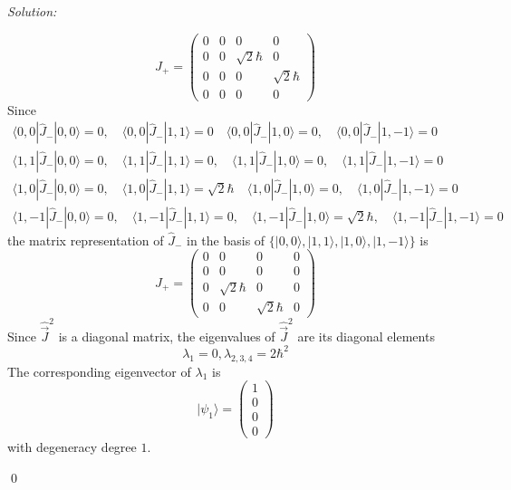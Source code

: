 \documentclass[10pt,a4paper]{article}
\newenvironment{sol}
    {\emph{Solution:}
    }
    {
    \qed
    }
\begin{document}
\begin{sol}
\begin{itemize}
\begin{equation}
\hat{J}_+=\left(\begin{array}{cccc}
0&0&0&0\\
0&0&\sqrt{2}\hbar&0\\
0&0&0&\sqrt{2}\hbar\\
0&0&0&0
\end{array}\right)
\end{equation}
Since
\begin{gather}
\langle0,0|\hat{J}_-|0,0\rangle=0,\quad\langle0,0|\hat{J}_-|1,1\rangle=0\quad\langle0,0|\hat{J}_-|1,0\rangle=0,\quad\langle0,0|\hat{J}_-|1,-1\rangle=0\\
\langle1,1|\hat{J}_-|0,0\rangle=0,\quad\langle1,1|\hat{J}_-|1,1\rangle=0,\quad\langle1,1|\hat{J}_-|1,0\rangle=0,\quad\langle1,1|\hat{J}_-|1,-1\rangle=0\\
\langle1,0|\hat{J}_-|0,0\rangle=0,\quad\langle1,0|\hat{J}_-|1,1\rangle=\sqrt{2}\hbar\quad\langle1,0|\hat{J}_-|1,0\rangle=0,\quad\langle1,0|\hat{J}_-|1,-1\rangle=0\\
\langle1,-1|\hat{J}_-|0,0\rangle=0,\quad\langle1,-1|\hat{J}_-|1,1\rangle=0,\quad\langle1,-1|\hat{J}_-|1,0\rangle=\sqrt{2}\hbar,\quad\langle1,-1|\hat{J}_-|1,-1\rangle=0
\end{gather}
the matrix representation of $\hat{J}_-$ in the basis of $\{|0,0\rangle,|1,1\rangle,|1,0\rangle,|1,-1\rangle\}$ is
\begin{equation}
\hat{J}_+=\left(\begin{array}{cccc}
0&0&0&0\\
0&0&0&0\\
0&\sqrt{2}\hbar&0&0\\
0&0&\sqrt{2}\hbar&0
\end{array}\right)
\end{equation}
Since $\hat{\vec{J}}^2$ is a diagonal matrix, the eigenvalues of $\hat{\vec{J}}^2$ are its diagonal elements
\begin{equation}
\lambda_1=0,\lambda_{2,3,4}=2\hbar^2
\end{equation}
The corresponding eigenvector of $\lambda_1$ is
\begin{equation}
|\psi_1\rangle=\left(\begin{array}{c}
1\\
0\\
0\\
0
\end{array}\right)
\end{equation}
with degeneracy degree $1$.\\

\end{itemize}
\end{sol}
\end{document}
